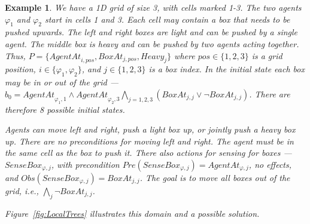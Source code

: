 \documentclass[letterpaper]{article} %
\newtheorem{example}{Example}
\theoremstyle{definition}
\begin{document}
\begin{example}
\label{ex:BoxPushing}
We have a 1D grid of size 3, with cells marked 1-3. The two agents $\varphi_1$ and $\varphi_2$ start in cells 1 and 3. Each cell may contain a box that needs to be pushed upwards. The left and right boxes are light and can be pushed
by a single agent. The middle box is heavy and can
be pushed by two agents acting together. Thus,
$P=\{\mathit{AgentAt}_{i,pos},\mathit{BoxAt}_{j,pos},\mathit{Heavy}_{j}\}$ where $pos \in \{1,2,3\}$ is a grid position, $i \in \{\varphi_1,\varphi_2\}$, and $j \in \{1,2,3\}$ is a box index. In the initial state each box may be in or out of the grid --- $b_0=\mathit{AgentAt}_{\varphi_1,1} \wedge \mathit{AgentAt}_{\varphi_2,3} \bigwedge_{j=1,2,3} (BoxAt_{j,j} \vee \neg BoxAt_{j,j})$. There are therefore 8 possible initial states.

Agents can move left and right, push a light box up, or jointly push a heavy box up. There are no preconditions for moving left and right. The agent must be
in the same cell as the box to push it.
%
There also actions for sensing for boxes --- $\mathit{SenseBox_{\varphi,j}}$, with precondition $\mathit{Pre(SenseBox_{\varphi,j})}=AgentAt_{\varphi,j}$, no effects, and $\mathit{Obs(SenseBox_{\varphi,j})}=BoxAt_{j,j}$.
The goal is to move all boxes out of the grid, i.e., $\bigwedge_j \neg BoxAt_{j,j}$.

Figure~\ref{fig:LocalTrees} illustrates this domain and a possible solution.
\end{example}
\end{document}
